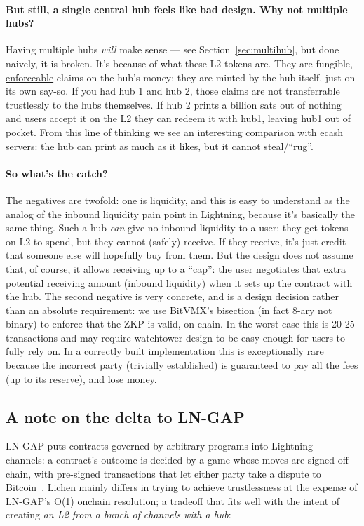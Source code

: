 \documentclass[11pt]{article}
\begin{document}
\paragraph{But still, a single central hub feels like bad design. Why not multiple hubs?} Having multiple hubs \emph{will} make sense --- see Section~\ref{sec:multihub}, but done naively, it is broken. It's because of what these L2 tokens are. They are fungible, \underline{enforceable} claims on the hub's money; they are minted by the hub itself, just on its own say-so. If you had hub 1 and hub 2, those claims are not transferrable trustlessly to the hubs themselves. If hub 2 prints a billion sats out of nothing and users accept it on the L2 they can redeem it with hub1, leaving hub1 out of pocket. From this line of thinking we see an interesting comparison with ecash servers: the hub can print as much as it likes, but it cannot steal/``rug''.

\paragraph{So what's the catch?} The negatives are twofold: one is liquidity, and this is easy to understand as the analog of the inbound liquidity pain point in Lightning, because it's basically the same thing. Such a hub \emph{can} give no inbound liquidity to a user: they get tokens on L2 to spend, but they cannot (safely) receive. If they receive, it's just credit that someone else will hopefully buy from them. But the design does not assume that, of course, it allows receiving up to a ``cap'': the user negotiates that extra potential receiving amount (inbound liquidity) when it sets up the contract with the hub. The second negative is very concrete, and is a design decision rather than an absolute requirement: we use BitVMX's bisection (in fact 8-ary not binary) to enforce that the ZKP is valid, on-chain. In the worst case this is 20-25 transactions and may require watchtower design to be easy enough for users to fully rely on. In a correctly built implementation this is exceptionally rare because the incorrect party (trivially established) is guaranteed to pay all the fees (up to its reserve), and lose money.

\subsection{A note on the delta to LN-GAP}
\label{sec:family}

LN-GAP\cite{lngap} puts contracts governed by arbitrary programs into Lightning~\cite{lightning}
channels: a contract's outcome is decided by a game whose moves are
signed off-chain, with pre-signed transactions that let either party
take a dispute to Bitcoin~\cite{lngap}. Lichen mainly differs in trying to achieve trustlessness at the expense of LN-GAP's O(1) onchain resolution; a tradeoff that fits well with the intent of creating \emph{an L2 from a bunch of channels with a hub}:
\end{document}
